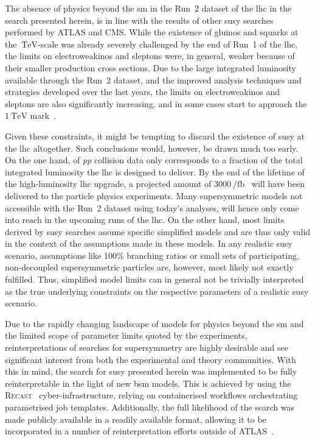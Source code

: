 The absence of physics beyond the \gls{sm} in the Run~2 dataset of the \gls{lhc} in the search presented herein, is in line with the results of other \gls{susy} searches performed by ATLAS and CMS.
While the existence of gluinos and squarks at the $\SI{}{\TeV}$-scale was already severely challenged by the end of Run~1 of the \gls{lhc}, the limits on electroweakinos and sleptons were, in general, weaker because of their smaller production cross sections.
Due to the large integrated luminosity available through the Run~2 dataset, and the improved analysis techniques and strategies developed over the last years, the limits on electroweakinos and sleptons are also significantly increasing, and in some cases start to approach the $\SI{1}{\TeV}$ mark~\cite{ATL-PHYS-PUB-2020-020,SUSY-2018-32}. 

Given these constraints, it might be tempting to discard the existence of \gls{susy} at the \gls{lhc} altogether. Such conclusions would, however, be drawn much too early.
On the one hand, \onethirtynineifb of \textit{pp} collision data only corresponds to a fraction of the total integrated luminosity the \gls{lhc} is designed to deliver. By the end of the lifetime of the high-luminosity \gls{lhc} upgrade, a projected amount of $\SI{3000}{\per\femto\barn}$~\cite{Apollinari:2116337} will have been delivered to the particle physics experiments.
Many supersymmetric models not accessible with the Run~2 dataset using today's analyses, will hence only come into reach in the upcoming runs of the \gls{lhc}.
On the other hand, most limits derived by \gls{susy} searches assume specific simplified models and are thus only valid in the context of the assumptions made in these models.
In any realistic \gls{susy} scenario, assumptions like 100\% branching ratios or small sets of participating, non-decoupled supersymmetric particles are, however, most likely not exactly fulfilled.
Thus, simplified model limits can in general not be trivially interpreted as the true underlying constraints on the respective parameters of a realistic \gls{susy} scenario.
 
Due to the rapidly changing landscape of models for physics beyond the \gls{sm} and the limited scope of parameter limits quoted by the experiments, reinterpretations of searches for supersymmetry are highly desirable and see significant interest from both the experimental and theory communities.
With this in mind, the search for \gls{susy} presented herein was implemented to be fully reinterpretable in the light of new \gls{bsm} models.
This is achieved by using the \textsc{Recast}~\cite{RECAST_cranmer} cyber-infrastructure, relying on containerised workflows orchestrating parametrised job templates.
Additionally, the full likelihood of the search was made publicly available in a readily available format, allowing it to be incorporated in a number of reinterpretation efforts outside of ATLAS~\cite{SModelS_pyhf:2020grj,Goodsell:2020ddr}. 
 
